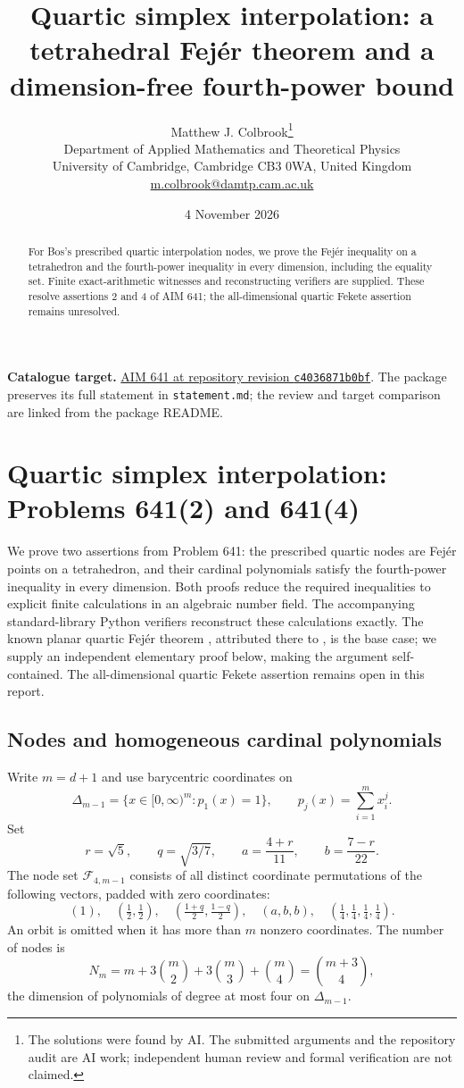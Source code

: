 \documentclass[11pt,a4paper]{article}
\title{Quartic simplex interpolation: a tetrahedral Fej\'er theorem and a dimension-free fourth-power bound}
\author{Matthew J. Colbrook\thanks{The solutions were found by AI. The submitted arguments and the repository audit are AI work; independent human review and formal verification are not claimed.}\\[4pt]
\small Department of Applied Mathematics and Theoretical Physics\\
\small University of Cambridge, Cambridge CB3 0WA, United Kingdom\\
\small\href{mailto:m.colbrook@damtp.cam.ac.uk}{m.colbrook@damtp.cam.ac.uk}}
\date{4 November 2026}
\theoremstyle{definition}
\theoremstyle{remark}
\numberwithin{equation}{section}
\begin{document}
\maketitle
\begin{abstract}
For Bos's prescribed quartic interpolation nodes, we prove the Fej\'er inequality on a tetrahedron and the fourth-power inequality in every dimension, including the equality set. Finite exact-arithmetic witnesses and reconstructing verifiers are supplied. These resolve assertions 2 and 4 of AIM 641; the all-dimensional quartic Fekete assertion remains unresolved.
\end{abstract}
\noindent\textbf{Catalogue target.} \href{https://github.com/MColbrook/AIM/blob/c4036871b0bf15cbc83e79c780b7191bcbb2cfed/problems/641-bos-simplex-interpolation-nodes.md}{AIM 641 at repository revision \texttt{c4036871b0bf}}. The package preserves its full statement in \texttt{statement.md}; the review and target comparison are linked from the package README.
\medskip

\section{Quartic simplex interpolation: Problems 641(2) and 641(4)}
\label{sec:simplex}

We prove two assertions from Problem 641: the prescribed quartic nodes are
Fej\'er points on a tetrahedron, and their cardinal polynomials satisfy the
fourth-power inequality in every dimension.  Both proofs reduce the required
inequalities to explicit finite calculations in an algebraic number field.
The accompanying standard-library Python verifiers reconstruct these
calculations exactly.  The known planar quartic Fej\'er theorem
\cite[Proposition 4.1]{bos2023}, attributed there to \cite{bos1983}, is the
base case; we supply an independent elementary proof below, making the
argument self-contained.  The all-dimensional quartic Fekete assertion
remains open in this report.

\subsection{Nodes and homogeneous cardinal polynomials}

Write $m=d+1$ and use barycentric coordinates on
\[
 \Delta_{m-1}=\{x\in[0,\infty)^m:p_1(x)=1\},
 \qquad p_j(x)=\sum_{i=1}^m x_i^j.
\]
Set
\[
 r=\sqrt5,\qquad q=\sqrt{3/7},\qquad
 a=\frac{4+r}{11},\qquad b=\frac{7-r}{22}.
\]
The node set $\mathcal F_{4,m-1}$ consists of all distinct coordinate
permutations of the following vectors, padded with zero coordinates:
\begin{equation}\label{eq:simplex-nodes}
 (1),\quad (\tfrac12,\tfrac12),\quad
 (\tfrac{1+q}{2},\tfrac{1-q}{2}),\quad
 (a,b,b),\quad (\tfrac14,\tfrac14,\tfrac14,\tfrac14).
\end{equation}
An orbit is omitted when it has more than $m$ nonzero coordinates.  The
number of nodes is
\[
 N_m=m+3\binom m2+3\binom m3+\binom m4=\binom{m+3}{4},
\]
the dimension of polynomials of degree at most four on $\Delta_{m-1}$.
\end{document}
